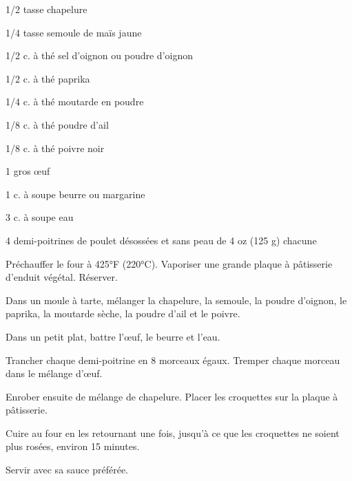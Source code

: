 


\totaltime{}


\begin{ingredients}
    \item 1/2 tasse chapelure
    \item 1/4 tasse semoule de maïs jaune
    \item 1/2 c. à thé sel d'oignon ou poudre d'oignon
    \item 1/2 c. à thé paprika
    \item 1/4 c. à thé moutarde en poudre
    \item 1/8 c. à thé poudre d'ail
    \item 1/8 c. à thé poivre noir
    \item 1 gros œuf
    \item 1 c. à soupe beurre ou margarine
    \item 3 c. à soupe eau
    \item 4 demi-poitrines de poulet désossées et sans peau de 4 oz (125 g) chacune
\end{ingredients}

\begin{steps}
    \item Préchauffer le four à 425°F (220°C). Vaporiser une grande plaque à pâtisserie d'enduit végétal. Réserver.
    \item Dans un moule à tarte, mélanger la chapelure, la semoule, la poudre d'oignon, le paprika, la moutarde sèche, la poudre d'ail et le poivre.
    \item Dans un petit plat, battre l'œuf, le beurre et l'eau.
    \item Trancher chaque demi-poitrine en 8 morceaux égaux. Tremper chaque morceau dans le mélange d'œuf.
    \item Enrober ensuite de mélange de chapelure. Placer les croquettes sur la plaque à pâtisserie.
    \item Cuire au four en les retournant une fois, jusqu'à ce que les croquettes ne soient plus rosées, environ 15 minutes.
    \item Servir avec sa sauce préférée.
\end{steps}
